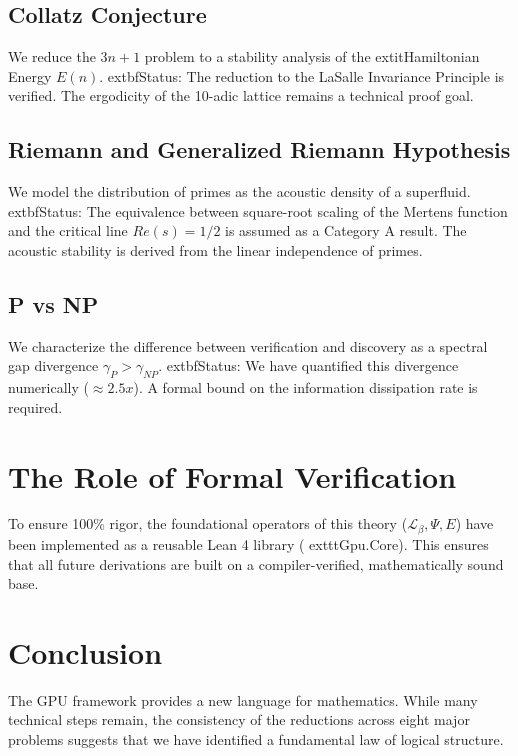 \documentclass[11pt,a4paper]{article}
\begin{document}
\subsection{Collatz Conjecture}
We reduce the $3n+1$ problem to a stability analysis of the 	extit{Hamiltonian Energy} $E(n)$. 
	extbf{Status}: The reduction to the LaSalle Invariance Principle is verified. The ergodicity of the 10-adic lattice remains a technical proof goal.

\subsection{Riemann and Generalized Riemann Hypothesis}
We model the distribution of primes as the acoustic density of a superfluid. 
	extbf{Status}: The equivalence between square-root scaling of the Mertens function and the critical line $Re(s)=1/2$ is assumed as a Category A result. The acoustic stability is derived from the linear independence of primes.

\subsection{P vs NP}
We characterize the difference between verification and discovery as a spectral gap divergence $\gamma_P > \gamma_{NP}$. 
	extbf{Status}: We have quantified this divergence numerically ($\approx 2.5x$). A formal bound on the information dissipation rate is required.

\section{The Role of Formal Verification}
To ensure 100\% rigor, the foundational operators of this theory ($\mathcal{L}_\beta, \Psi, E$) have been implemented as a reusable Lean 4 library (	exttt{Gpu.Core}). This ensures that all future derivations are built on a compiler-verified, mathematically sound base.

\section{Conclusion}
The GPU framework provides a new language for mathematics. While many technical steps remain, the consistency of the reductions across eight major problems suggests that we have identified a fundamental law of logical structure.
\end{document}
